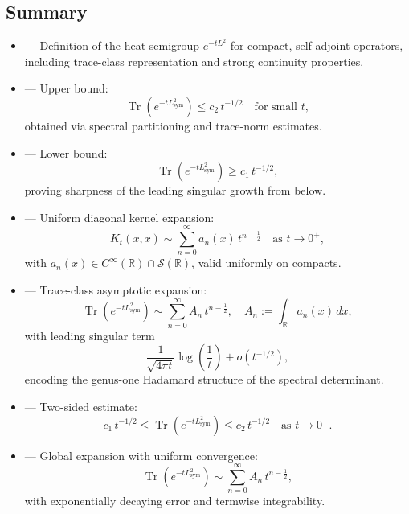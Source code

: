 \subsection*{Summary}

\begin{itemize}
  \item {} — Definition of the heat semigroup \( e^{-tL^2} \) for compact, self-adjoint operators, including trace-class representation and strong continuity properties.

  \item {} — Upper bound:
  \[
  \operatorname{Tr}(e^{-tL_{\mathrm{sym}}^2}) \leq c_2\, t^{-1/2}
  \quad \text{for small } t,
  \]
  obtained via spectral partitioning and trace-norm estimates.

  \item {} — Lower bound:
  \[
  \operatorname{Tr}(e^{-tL_{\mathrm{sym}}^2}) \geq c_1\, t^{-1/2},
  \]
  proving sharpness of the leading singular growth from below.

  \item {} — Uniform diagonal kernel expansion:
  \[
  K_t(x,x) \sim \sum_{n=0}^\infty a_n(x)\, t^{n - \frac{1}{2}} \quad \text{as } t \to 0^+,
  \]
  with \( a_n(x) \in C^\infty(\mathbb{R}) \cap \mathcal{S}(\mathbb{R}) \), valid uniformly on compacts.

  \item {} — Trace-class asymptotic expansion:
  \[
  \operatorname{Tr}(e^{-tL_{\mathrm{sym}}^2}) \sim \sum_{n=0}^\infty A_n\, t^{n - \frac{1}{2}}, \quad
  A_n := \int_{\mathbb{R}} a_n(x)\, dx,
  \]
  with leading singular term
  \[
  \frac{1}{\sqrt{4\pi t}} \log\left(\frac{1}{t}\right) + o(t^{-1/2}),
  \]
  encoding the genus-one Hadamard structure of the spectral determinant.

  \item {} — Two-sided estimate:
  \[
  c_1\, t^{-1/2} \leq \operatorname{Tr}(e^{-tL_{\mathrm{sym}}^2}) \leq c_2\, t^{-1/2} \quad \text{as } t \to 0^+.
  \]

  \item {} — Global expansion with uniform convergence:
  \[
  \operatorname{Tr}(e^{-tL_{\mathrm{sym}}^2}) \sim \sum_{n=0}^\infty A_n\, t^{n - \frac{1}{2}},
  \]
  with exponentially decaying error and termwise integrability.


\end{itemize}

